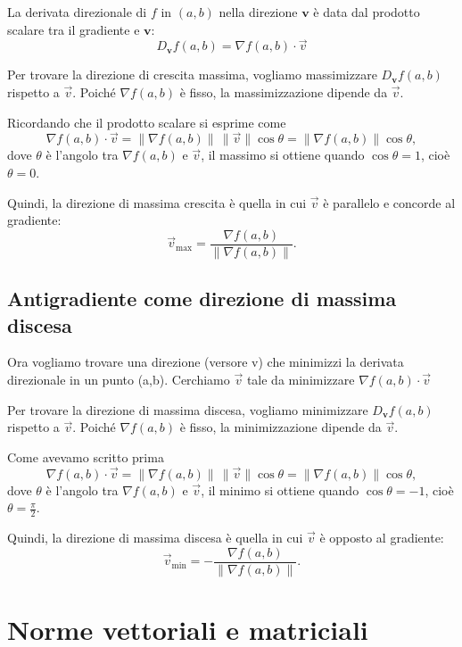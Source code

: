\documentclass[12pt,a4paper]{article}
\begin{document}
La derivata direzionale di \( f \) in \((a,b)\) nella direzione \(\mathbf{v}\) è data dal prodotto scalare tra il gradiente e \(\mathbf{v}\):
\[
D_{\mathbf{v}} f(a,b) = \nabla f(a,b) \cdot \vec{v}
\]

Per trovare la direzione di crescita massima, vogliamo massimizzare \( D_{\mathbf{v}} f(a,b) \) rispetto a \(\vec{v}\). Poiché \(\nabla f(a,b)\) è fisso, la massimizzazione dipende da \(\vec{v}\).

Ricordando che il prodotto scalare si esprime come
\[
\nabla f(a,b) \cdot \vec{v} = \|\nabla f(a,b)\| \, \|\vec{v}\| \cos \theta = \|\nabla f(a,b)\| \cos \theta,
\]
dove \(\theta\) è l'angolo tra \(\nabla f(a,b)\) e \(\vec{v}\), il massimo si ottiene quando \(\cos \theta = 1\), cioè \(\theta = 0\).

Quindi, la direzione di massima crescita è quella in cui \(\vec{v}\) è parallelo e concorde al gradiente:
\[
\vec{v}_{\max} = \frac{\nabla f(a,b)}{\|\nabla f(a,b)\|}.
\]

\subsection*{Antigradiente come direzione di massima discesa}

Ora vogliamo trovare una direzione (versore v) che minimizzi la derivata direzionale in un punto (a,b). Cerchiamo $\vec{v}$ tale da minimizzare $\nabla f(a,b)\cdot \vec{v}$

Per trovare la direzione di massima discesa, vogliamo minimizzare \( D_{\mathbf{v}} f(a,b) \) rispetto a \(\vec{v}\). Poiché \(\nabla f(a,b)\) è fisso, la minimizzazione dipende da \(\vec{v}\).

Come avevamo scritto prima
\[
\nabla f(a,b) \cdot \vec{v} = \|\nabla f(a,b)\| \, \|\vec{v}\| \cos \theta = \|\nabla f(a,b)\| \cos \theta,
\]
dove \(\theta\) è l'angolo tra \(\nabla f(a,b)\) e \(\vec{v}\), il minimo si ottiene quando \(\cos \theta = -1\), cioè \(\theta = \frac{\pi}{2}\).

Quindi, la direzione di massima discesa è quella in cui \(\vec{v}\) è opposto al gradiente:
\[
\vec{v}_{\min} = -\frac{\nabla f(a,b)}{\|\nabla f(a,b)\|}.
\]


\section*{Norme vettoriali e matriciali}
\end{document}
